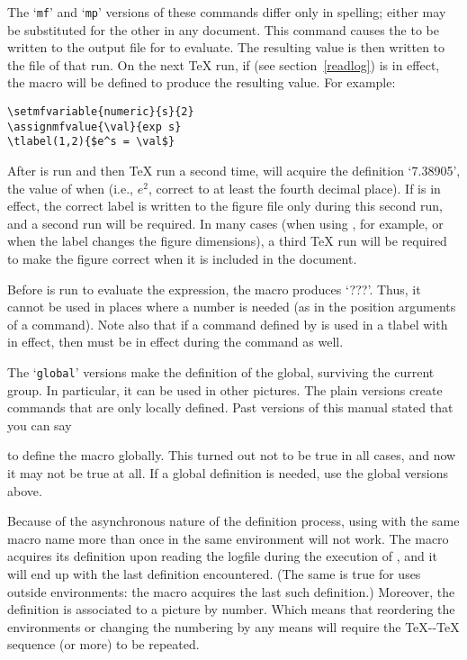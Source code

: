 \documentclass[letterpaper]{article}
\begin{document}
The `\texttt{mf}' and `\texttt{mp}' versions of these commands differ
only in spelling; either may be substituted for the other in any
document. This command causes the  to be written to the
output file for \MF{} to evaluate. The resulting value is then written
to the  file of that \MF{} run. On the next \TeX{} run, if
 (see section~\ref{readlog}) is in effect, the macro
 will be defined to produce the resulting value. For
example:
\begin{verbatim}
\setmfvariable{numeric}{s}{2}
\assignmfvalue{\val}{exp s}
\tlabel(1,2){$e^s = \val$}
\end{verbatim}
After \MF{} is run and then \TeX{} run a second time,  will
acquire the definition `7.38905', the value of  when
 (i.e., $e^2$, correct to at least the fourth decimal place).
If  is in effect, the correct label is written to the
figure file only during this second run, and a second \MP{} run will be
required. In many cases (when using \pdfTeX{}, for example, or when the
label changes the figure dimensions), a third \TeX{} run will be
required to make the figure correct when it is included in the document.

Before \MF{} is run to evaluate the expression, the macro produces
`???'. Thus, it cannot be used in places where a number is needed (as in
the position arguments of a  command). Note also that if a
command defined by  is used in a tlabel with
 in effect, then  must be in effect during
the  command as well.

The `\texttt{global}' versions make the definition of the
 global, surviving the current group. In particular,
it can be used in other pictures. The plain versions create commands
that are only locally defined. Past versions of this manual stated that
you can say
\begin{display}
\end{display}
to define the macro globally. This turned out not to be true in all
cases, and now it may not be true at all. If a global definition is
needed, use the global versions above.

Because of the asynchronous nature of the definition process, using
 with the same macro name more than once in the same
 environment will not work. The macro acquires its definition
upon reading the logfile during the execution of ,
and it will end up with the last definition encountered. (The same is
true for uses outside  environments: the macro acquires the
last such definition.)  Moreover, the definition is associated to a
picture by number. Which means that reordering the environments or
changing the numbering by any means will require the \TeX{}-\MF{}-\TeX{}
sequence (or more) to be repeated.
\end{document}

